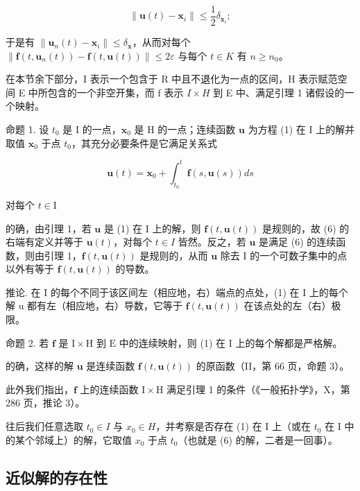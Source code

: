 \[
\left\| \mathbf {u} (t) - \mathbf {x} _ {i} \right\| \leqslant \frac {1}{2} \delta_ {\mathbf {x} _ {i}};
\]

于是有 \(\|\mathbf{u}_{n}(t)-\mathbf{x}_{i}\|\leqslant\delta_{\mathbf{x}}\)，从而对每个 \(\|\mathbf{f}(t,\mathbf{u}_{n}(t))-\mathbf{f}(t,\mathbf{u}(t))\|\leqslant2\varepsilon\) 与每个 \(t\in K\) 有 \(n\geqslant n_{0}\)。

在本节余下部分，I 表示一个包含于 R 中且不退化为一点的区间，H 表示赋范空间 E 中所包含的一个非空开集，而 f 表示 \(I \times H\) 到 E 中、满足引理 1 诸假设的一个映射。

命题 1. 设 \(t_0\) 是 I 的一点，\(\mathbf{x}_0\) 是 H 的一点；连续函数 \(\mathbf{u}\) 为方程 (1) 在 I 上的解并取值 \(\mathbf{x}_0\) 于点 \(t_0\)，其充分必要条件是它满足关系式

\[
\mathbf {u} (t) = \mathbf {x} _ {0} + \int_ {t _ {0}} ^ {t} \mathbf {f} (s, \mathbf {u} (s)) d s\tag{6}
\]

对每个 \(t\in \mathrm{I}\)

的确，由引理 1，若 \(\mathbf{u}\) 是 (1) 在 I 上的解，则 \(\mathbf{f}(t, \mathbf{u}(t))\) 是规则的，故 (6) 的右端有定义并等于 \(\mathbf{u}(t)\)，对每个 \(t \in I\) 皆然。反之，若 \(\mathbf{u}\) 是满足 (6) 的连续函数，则由引理 1，\(\mathbf{f}(t, \mathbf{u}(t))\) 是规则的，从而 \(\mathbf{u}\) 除去 I 的一个可数子集中的点以外有等于 \(\mathbf{f}(t, \mathbf{u}(t))\) 的导数。

推论. 在 I 的每个不同于该区间左（相应地，右）端点的点处，(1) 在 I 上的每个解 u 都有左（相应地，右）导数，它等于 \(\mathbf{f}(t,\mathbf{u}(t))\) 在该点处的左（右）极限。

命题 2. 若 \(\mathbf{f}\) 是 \(\mathrm{I} \times \mathrm{H}\) 到 \(\mathrm{E}\) 中的连续映射，则 (1) 在 \(\mathrm{I}\) 上的每个解都是严格解。

的确，这样的解 \(\mathbf{u}\) 是连续函数 \(\mathbf{f}(t,\mathbf{u}(t))\) 的原函数（II，第 66 页，命题 3）。

此外我们指出，\(\mathbf{f}\) 上的连续函数 \(\mathrm{I} \times \mathrm{H}\) 满足引理 1 的条件（《一般拓扑学》，X，第 286 页，推论 3）。

往后我们任意选取 \(t_{0} \in I\) 与 \(x_{0} \in H\)，并考察是否存在 (1) 在 I 上（或在 \(t_{0}\) 在 I 中的某个邻域上）的解，它取值 \(x_{0}\) 于点 \(t_{0}\)（也就是 (6) 的解，二者是一回事）。

\subsection{近似解的存在性}

